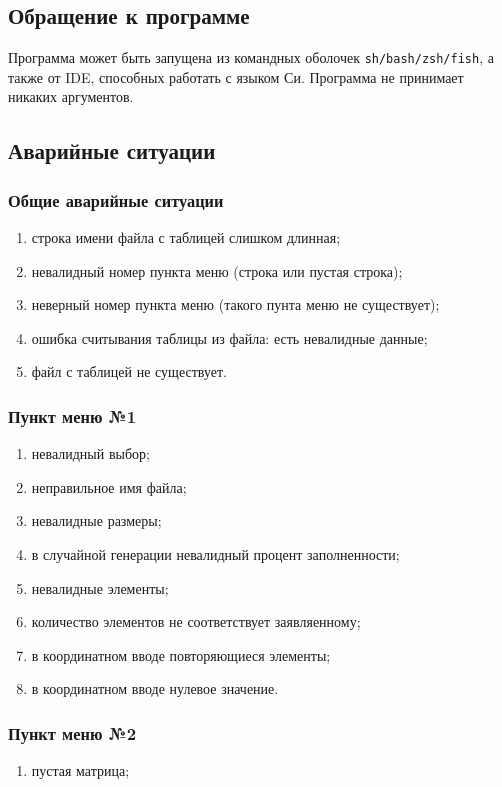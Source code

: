 \documentclass[a4paper,12pt]{extarticle}
\begin{document}
\subsection{Обращение к программе}
Программа может быть запущена из командных оболочек \texttt{sh/bash/zsh/fish}, а также от IDE, способных работать с языком Си. Программа не принимает никаких аргументов.

\subsection{Аварийные ситуации}
\subsubsection{Общие аварийные ситуации}
\begin{enumerate}
    \item строка имени файла с таблицей слишком длинная;
    \item невалидный номер пункта меню (строка или пустая строка);
    \item неверный номер пункта меню (такого пунта меню не существует);
    \item ошибка считывания таблицы из файла: есть невалидные данные;
    \item файл с таблицей не существует.
\end{enumerate}

\subsubsection{Пункт меню №1}
\begin{enumerate}
    \item невалидный выбор;
    \item неправильное имя файла;
    \item невалидные размеры;
    \item в случайной генерации невалидный процент заполненности;
    \item невалидные элементы;
    \item количество элементов не соответствует заявляенному;
    \item в координатном вводе повторяющиеся элементы;
    \item в координатном вводе нулевое значение.
\end{enumerate}

\subsubsection{Пункт меню №2}
\begin{enumerate}
    \item пустая матрица;
\end{enumerate}
\end{document}
